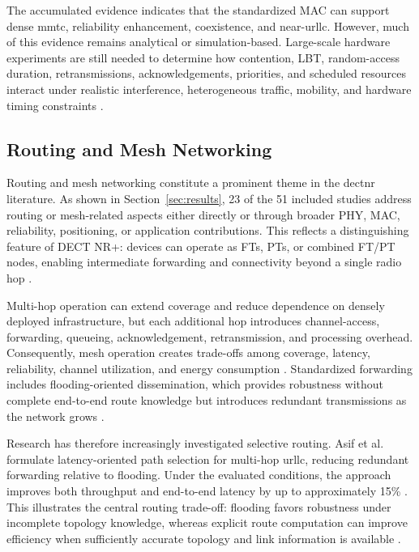 The accumulated evidence indicates that the standardized MAC can support
dense \gls{mmtc}, reliability enhancement, coexistence, and near-\gls{urllc}.
However, much of this evidence remains analytical or simulation-based.
Large-scale hardware experiments are still needed to determine how
contention, LBT, random-access duration, retransmissions, acknowledgements,
priorities, and scheduled resources interact under realistic interference,
heterogeneous traffic, mobility, and hardware timing constraints
\cite{gaidamakaOptimizingDelaysRandom2025,
glazkovImprovingNearURLLCServices2025,
ahmadMACLayerProtocolUltraReliable2025}.


\subsection{Routing and Mesh Networking}
\label{subsec:routing}

Routing and mesh networking constitute a prominent theme in the \gls{dectnr}
literature. As shown in Section~\ref{sec:results}, 23 of the 51 included
studies address routing or mesh-related aspects either directly or through
broader PHY, MAC, reliability, positioning, or application contributions.
This reflects a distinguishing feature of DECT NR+: devices can operate as
FTs, PTs, or combined FT/PT nodes, enabling intermediate forwarding and
connectivity beyond a single radio hop
\cite{etsi_ts103636_1,etsi_ts103636_4,etsi_ts103636_5,
kovalchukovDECT2020NewRadio2022,
perez-guiraoDECTNRUnveiling2022}.

Multi-hop operation can extend coverage and reduce dependence on densely
deployed infrastructure, but each additional hop introduces channel-access,
forwarding, queueing, acknowledgement, retransmission, and processing
overhead. Consequently, mesh operation creates trade-offs among coverage,
latency, reliability, channel utilization, and energy consumption
\cite{etsi_ts103636_4,etsi_ts103636_5,
samuylovPerformanceMACLayer2024a}. Standardized forwarding includes
flooding-oriented dissemination, which provides robustness without complete
end-to-end route knowledge but introduces redundant transmissions as the
network grows
\cite{etsi_ts103636_5}.

Research has therefore increasingly investigated selective routing. Asif
et al. formulate latency-oriented path selection for multi-hop \gls{urllc},
reducing redundant forwarding relative to flooding. Under the evaluated
conditions, the approach improves both throughput and end-to-end latency by up
to approximately 15\%
\cite{asifURLLCBasedMultiHopCommunication2025}. This illustrates the central
routing trade-off: flooding favors robustness under incomplete topology
knowledge, whereas explicit route computation can improve efficiency when
sufficiently accurate topology and link information is available
\cite{asifURLLCBasedMultiHopCommunication2025,
fuhrlingRobustRoutingProtocol2025b}.


